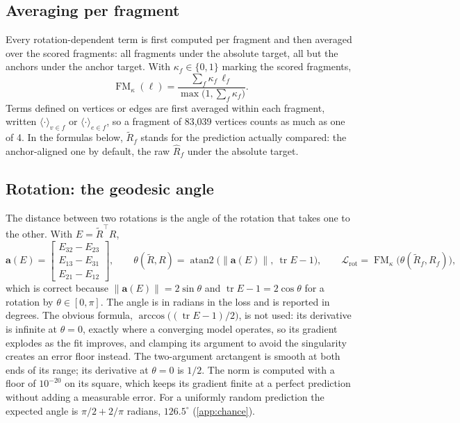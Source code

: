 \documentclass[11pt,a4paper]{article}
\theoremstyle{remark}
\newcommand{\T}{^{\top}}
\newcommand{\norm}[1]{\lVert #1\rVert}
\DeclareMathOperator{\atantwo}{atan2}
\DeclareMathOperator{\tr}{tr}
\begin{document}
\subsection{Averaging per fragment}
Every rotation-dependent term is first computed per fragment and then averaged over the scored fragments: all fragments under the absolute target, all but the anchors under the anchor target. With $\kappa_f\in\{0,1\}$ marking the scored fragments,
\begin{equation}
  \operatorname{FM}_\kappa(\ell)=\frac{\sum_f\kappa_f\,\ell_f}{\max\big(1,\sum_f\kappa_f\big)}.
\end{equation}
Terms defined on vertices or edges are first averaged within each fragment, written $\langle\cdot\rangle_{v\in f}$ or $\langle\cdot\rangle_{e\in f}$, so a fragment of 83{,}039 vertices counts as much as one of 4. In the formulas below, $\tilde R_f$ stands for the prediction actually compared: the anchor-aligned one by default, the raw $\hat R_f$ under the absolute target.

\subsection{Rotation: the geodesic angle}
\label{sec:rotloss}
The distance between two rotations is the angle of the rotation that takes one to the other. With $E=\tilde R\T R$,
\begin{equation}
  \mathbf a(E)=\begin{bmatrix}E_{32}-E_{23}\\ E_{13}-E_{31}\\ E_{21}-E_{12}\end{bmatrix},\qquad
  \theta(\tilde R,R)=\atantwo\big(\norm{\mathbf a(E)},\ \tr E-1\big),\qquad
  \mathcal L_{\mathrm{rot}}=\operatorname{FM}_\kappa\big(\theta(\tilde R_f,R_f)\big),
\end{equation}
which is correct because $\norm{\mathbf a(E)}=2\sin\theta$ and $\tr E-1=2\cos\theta$ for a rotation by $\theta\in[0,\pi]$. The angle is in radians in the loss and is reported in degrees. The obvious formula, $\arccos\big((\tr E-1)/2\big)$, is not used: its derivative is infinite at $\theta=0$, exactly where a converging model operates, so its gradient explodes as the fit improves, and clamping its argument to avoid the singularity creates an error floor instead. The two-argument arctangent is smooth at both ends of its range; its derivative at $\theta=0$ is $1/2$. The norm is computed with a floor of $10^{-20}$ on its square, which keeps its gradient finite at a perfect prediction without adding a measurable error. For a uniformly random prediction the expected angle is $\pi/2+2/\pi$ radians, $126.5^\circ$ (\cref{app:chance}).
\end{document}
